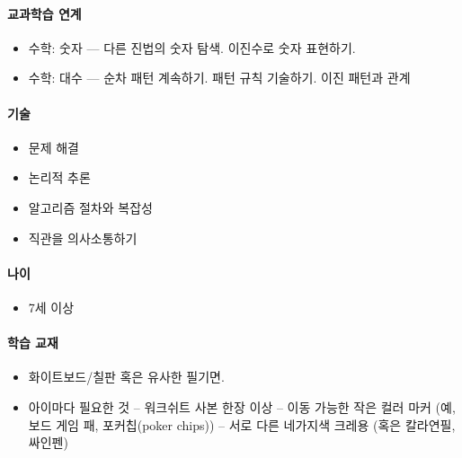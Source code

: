 \documentclass[]{article}
\begin{document}
\mbox{}\paragraph{교과학습 연계}\label{section-184}

\begin{itemize}
\itemsep1pt\parskip0pt
\item
  수학: 숫자 --- 다른 진법의 숫자 탐색. 이진수로 숫자 표현하기.
\item
  수학: 대수 --- 순차 패턴 계속하기. 패턴 규칙 기술하기. 이진 패턴과
  관계
\end{itemize}

\mbox{}\paragraph{기술}\label{section-185}

\begin{itemize}
\itemsep1pt\parskip0pt
\item
  문제 해결
\item
  논리적 추론
\item
  알고리즘 절차와 복잡성
\item
  직관을 의사소통하기
\end{itemize}

\mbox{}\paragraph{나이}\label{section-186}

\begin{itemize}
\itemsep1pt\parskip0pt
\item
  7세 이상
\end{itemize}

\mbox{}\paragraph{학습 교재}\label{section-187}

\begin{itemize}
\itemsep1pt\parskip0pt
\item
  화이트보드/칠판 혹은 유사한 필기면.
\item
  아이마다 필요한 것 -- 워크쉬트 사본 한장 이상 -- 이동 가능한 작은 컬러
  마커 (예, 보드 게임 패, 포커칩(poker chips)) -- 서로 다른 네가지색
  크레용 (혹은 칼라연필, 싸인펜)
\end{itemize}

\end{document}
